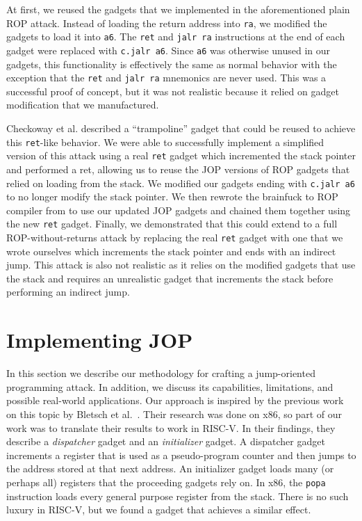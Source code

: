 At first, we reused the gadgets that we implemented in the aforementioned plain ROP
attack. Instead of loading the return address into \verb|ra|, we modified the
gadgets to load it into \verb|a6|. The \verb|ret| and \verb|jalr ra|
instructions at the end of each gadget were replaced with \verb|c.jalr a6|.
Since \verb|a6| was otherwise unused in our gadgets, this functionality is
effectively the same as normal behavior with the exception that the \verb|ret|
and \verb|jalr ra| mnemonics are never used. This was a successful proof of
concept, but it was not realistic because it relied on gadget modification that
we manufactured.

Checkoway et al. described a ``trampoline'' gadget that could be reused to
achieve this \verb|ret|-like behavior. We were able to successfully implement
a simplified version of this attack using a real \verb|ret| gadget which incremented
the stack pointer and performed a ret, allowing us to reuse the JOP versions of ROP gadgets that
relied on loading from the stack. We modified our gadgets ending with \verb|c.jalr a6|
to no longer modify the stack pointer. We then rewrote the brainfuck to ROP compiler
from \cite{gu20ropriscv} to use our updated JOP gadgets and chained them together
using the new \verb|ret| gadget. Finally, we demonstrated that this could extend to a
full ROP-without-returns attack by replacing the real \verb|ret| gadget with one
that we wrote ourselves which increments the stack pointer and ends with an indirect jump.
This attack is also not realistic as it relies on the modified gadgets that use the stack
and requires an unrealistic gadget that increments the stack before performing an indirect jump.

\section{Implementing JOP}

In this section we describe our methodology for crafting a jump-oriented
programming attack. In addition, we discuss its capabilities, limitations, and
possible real-world applications. Our approach is inspired by the previous work
on this topic by Bletsch et al.~\cite{bletsch11jopx86}. Their research was done
on x86, so part of our work was to translate their results to work in RISC-V. In
their findings, they describe a \textit{dispatcher} gadget and an
\textit{initializer} gadget. A dispatcher gadget increments a register that is
used as a pseudo-program counter and then jumps to the address stored at that
next address. An initializer gadget loads many (or perhaps all) registers that
the proceeding gadgets rely on. In x86, the \verb|popa| instruction loads every
general purpose register from the stack. There is no such luxury in RISC-V, but
we found a gadget that achieves a similar effect.

